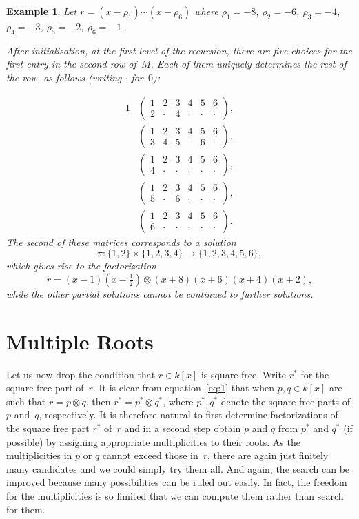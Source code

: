 \documentclass{sig-alternate}
\newtheorem{example}[theorem]{Example}
\begin{document}
\begin{example}
  Let $r=(x-\rho_1)\cdots(x-\rho_6)$ where
  $\rho_1=-8$, $\rho_2=-6$, $\rho_3=-4$, $\rho_4=-3$,
  $\rho_5=-2$, $\rho_6=-1$.

  After initialisation, at the first level of the recursion, there are five choices
  for the first entry in the second row of~$M$. Each of them uniquely determines the
  rest of the row, as follows (writing $\cdot$ for~$0$):

  \begin{alignat*}1
    &\begin{pmatrix}
    1&2&3&4&5&6\\
    2&\cdot&4&\cdot&\cdot&\cdot
    \end{pmatrix},\\
    &\begin{pmatrix}
    1&2&3&4&5&6\\
    3&4&5&\cdot&6&\cdot
    \end{pmatrix},\\
    &\begin{pmatrix}
    1&2&3&4&5&6\\
    4&\cdot&\cdot&\cdot&\cdot&\cdot
    \end{pmatrix},\\
    &\begin{pmatrix}
    1&2&3&4&5&6\\
    5&\cdot&6&\cdot&\cdot&\cdot
    \end{pmatrix},\\
    &\begin{pmatrix}
    1&2&3&4&5&6\\
    6&\cdot&\cdot&\cdot&\cdot&\cdot
    \end{pmatrix}.
  \end{alignat*}
  The second of these matrices corresponds to a solution
  \[
    \pi\colon\{1,2\}\times\{1,2,3,4\}\to\{1,2,3,4,5,6\},
  \]
  which gives rise to the factorization
  \[
  r=(x-1)(x-\tfrac12)\otimes(x+8)(x+6)(x+4)(x+2),
  \]
  while the other partial solutions cannot be continued to further solutions.   
\end{example}

\section{Multiple Roots}

Let us now drop the condition that $r\in k[x]$ is square free. Write $r^\ast$
for the square free part of~$r$. It is clear from equation~\eqref{eq:1} that
when $p,q\in k[x]$ are such that $r=p\otimes q$, then $r^\ast=p^\ast\otimes
q^\ast$, where $p^\ast,q^\ast$ denote the square free parts of $p$ and~$q$,
respectively. It is therefore natural to first determine factorizations of the
square free part $r^\ast$ of~$r$ and in a second step obtain $p$ and $q$ from
$p^\ast$ and $q^\ast$ (if possible) by assigning appropriate multiplicities to
their roots. As the multiplicities in $p$ or $q$ cannot exceed those in~$r$,
there are again just finitely many candidates and we could simply try them all.
And again, the search can be improved because many possibilities can be ruled
out easily. In fact, the freedom for the multiplicities is so limited that we
can compute them rather than search for them.
\end{document}
